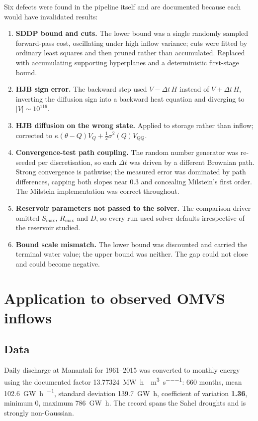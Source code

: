 \documentclass[12pt,a4paper]{article}
\begin{document}
Six defects were found in the pipeline itself and are documented because each
would have invalidated results:

\begin{enumerate}[itemsep=2pt]
\item \textbf{SDDP bound and cuts.} The lower bound was a single randomly sampled
forward-pass cost, oscillating under high inflow variance; cuts were fitted by
ordinary least squares and then pruned rather than accumulated. Replaced with
accumulating supporting hyperplanes and a deterministic first-stage bound.
\item \textbf{HJB sign error.} The backward step used $V - \Delta t\,H$ instead of
$V + \Delta t\,H$, inverting the diffusion sign into a backward heat equation and
diverging to $|V|\sim10^{116}$.
\item \textbf{HJB diffusion on the wrong state.} Applied to storage rather than
inflow; corrected to $\kappa(\theta-Q)V_Q + \tfrac{1}{2}\sigma^2(Q)V_{QQ}$.
\item \textbf{Convergence-test path coupling.} The random number generator was
re-seeded per discretisation, so each $\Delta t$ was driven by a different
Brownian path. Strong convergence is pathwise; the measured error was dominated
by path differences, capping both slopes near 0.3 and concealing Milstein's first
order. The Milstein implementation was correct throughout.
\item \textbf{Reservoir parameters not passed to the solver.} The comparison
driver omitted $S_{\max}$, $R_{\max}$ and $D$, so every run used solver defaults
irrespective of the reservoir studied.
\item \textbf{Bound scale mismatch.} The lower bound was discounted and carried
the terminal water value; the upper bound was neither. The gap could not close
and could become negative.
\end{enumerate}

\section{Application to observed OMVS inflows}

\subsection{Data}

Daily discharge at Manantali for 1961--2015 was converted to monthly energy using
the documented factor \SI{13.77324}{\mega\watt\hour\per\dday\per\cubic\metre\per\second}:
660 months, mean \SI{102.6}{\giga\watt\hour\per\dmonth}, standard deviation
\SI{139.7}{\giga\watt\hour}, coefficient of variation \textbf{1.36}, minimum 0,
maximum \SI{786}{\giga\watt\hour}. The record spans the Sahel droughts and is
strongly non-Gaussian.
\end{document}

